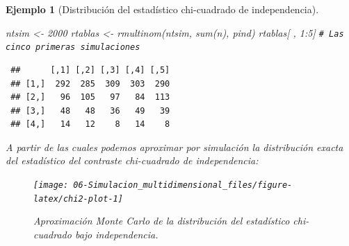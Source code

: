 \documentclass[
]{book}
\newenvironment{Shaded}{\begin{snugshade}}{\end{snugshade}}
\newcommand{\AttributeTok}[1]{\textcolor[rgb]{0.77,0.63,0.00}{#1}}
\newcommand{\CommentTok}[1]{\textcolor[rgb]{0.56,0.35,0.01}{\textit{#1}}}
\newcommand{\ConstantTok}[1]{\textcolor[rgb]{0.00,0.00,0.00}{#1}}
\newcommand{\ControlFlowTok}[1]{\textcolor[rgb]{0.13,0.29,0.53}{\textbf{#1}}}
\newcommand{\DecValTok}[1]{\textcolor[rgb]{0.00,0.00,0.81}{#1}}
\newcommand{\FunctionTok}[1]{\textcolor[rgb]{0.00,0.00,0.00}{#1}}
\newcommand{\NormalTok}[1]{#1}
\newcommand{\OtherTok}[1]{\textcolor[rgb]{0.56,0.35,0.01}{#1}}
\newcommand{\SpecialCharTok}[1]{\textcolor[rgb]{0.00,0.00,0.00}{#1}}
\newcommand{\StringTok}[1]{\textcolor[rgb]{0.31,0.60,0.02}{#1}}
\theoremstyle{break}
\newtheorem{example}{Ejemplo}[chapter]
\theoremstyle{nonumberplain}
\renewcommand{\CommentTok}[1]{\textcolor[rgb]{0.41,0.41,0.41}{\texttt{#1}}}
\begin{document}
\begin{example}[Distribución del estadístico chi-cuadrado de independencia]
\begin{Shaded}
\begin{Highlighting}[]
\NormalTok{ntsim }\OtherTok{\textless{}{-}} \DecValTok{2000}
\NormalTok{rtablas }\OtherTok{\textless{}{-}} \FunctionTok{rmultinom}\NormalTok{(ntsim, }\FunctionTok{sum}\NormalTok{(n), pind)}
\NormalTok{rtablas[ , }\DecValTok{1}\SpecialCharTok{:}\DecValTok{5}\NormalTok{] }\CommentTok{\# Las cinco primeras simulaciones}
\end{Highlighting}
\end{Shaded}

\begin{verbatim}
 ##      [,1] [,2] [,3] [,4] [,5]
 ## [1,]  292  285  309  303  290
 ## [2,]   96  105   97   84  113
 ## [3,]   48   48   36   49   39
 ## [4,]   14   12    8   14    8
\end{verbatim}

A partir de las cuales podemos aproximar por simulación la distribución exacta del estadístico del contraste chi-cuadrado de independencia:

\begin{Shaded}
\end{Shaded}

\begin{figure}[!htb]

{\centering \texttt{[image: 06-Simulacion\_multidimensional\_files/figure-latex/chi2-plot-1]} 

}

\caption{Aproximación Monte Carlo de la distribución del estadístico chi-cuadrado bajo independencia.}\label{fig:chi2-plot}
\end{figure}


\end{example}
\end{document}
